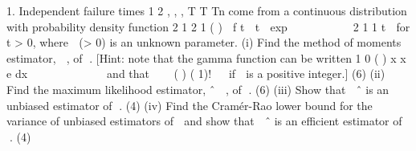 1. Independent failure times
1 2 , , , T T Tn
come from a continuous distribution with
probability density function
2
1
2
1
( )

f t  t

exp









2
1
1
t

for t > 0,
where  (> 0) is an unknown parameter.
(i) Find the method of moments estimator,
 ,
of . [Hint: note that the gamma
       function can be written
       1
       0
       ( ) x
       x e dx     
            
       and that
          ( ) ( 1)!  
       if 
       is a positive integer.]
(6)
(ii) Find the maximum likelihood estimator,
ˆ
 ,
of .
(6)
(iii) Show that

ˆ
is an unbiased estimator of .
(4)
(iv) Find the Cramér-Rao lower bound for the variance of unbiased estimators of 
and show that

ˆ
is an efficient estimator of .
(4)
